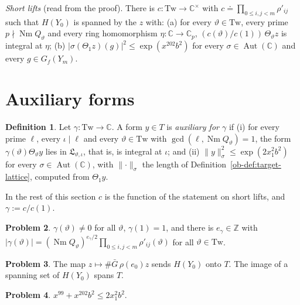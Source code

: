 \documentclass[reqno]{amsart}
\theoremstyle{definition}
\newtheorem{problem}{Problem}[section]
\newtheorem{definition}[problem]{Definition}
\theoremstyle{plain}
\newcommand{\Z}{\mathbb Z}
\newcommand{\C}{\mathbb C}
\newcommand{\Nm}{\operatorname{Nm}}
\newcommand{\Tw}{\mathrm{Tw}}
\newcommand{\Gb}{\bar G}
\begin{document}
\emph{Short lifts} (read from the proof).  There is \(c\colon\Tw\to\C^\times\) with \(c \doteq \prod_{0 \le i, j < m}\rho'_{ij}\) such that \(H(Y_0)\) is spanned by the \(z\) with: (a) for every \(\vartheta \in \Tw\), every prime \(p \nmid \Nm Q_\vartheta\) and every ring homomorphism \(\eta\colon\C\to\C_p\), \((c(\vartheta)/c(1))\,\Theta_\vartheta z\) is integral at \(\eta\); (b) \(\lvert\sigma(\Theta_1z)(g)\rvert^2 \le \exp(x^{202}b^2)\) for every \(\sigma \in \operatorname{Aut}(\C)\) and every \(g \in G_f(Y_m)\).

\section{Auxiliary forms}\label{sec:aux}

\begin{definition}\label{def:aux}
Let \(\gamma\colon\Tw\to\C\).  A form \(y \in T\) is \emph{auxiliary for \(\gamma\)} if
(i) for every prime \(\ell\), every \(\iota \mid \ell\) and every \(\vartheta \in \Tw\) with \(\gcd(\ell, \Nm Q_\vartheta) = 1\), the form \(\gamma(\vartheta)\Theta_\vartheta y\) lies in \(\mathfrak L_{\vartheta,\iota}\), that is, is integral at \(\iota\); and
(ii) \(\lVert y\rVert_\sigma^2 \le \exp(2x_1^2b^2)\) for every \(\sigma \in \operatorname{Aut}(\C)\), with \(\lVert\cdot\rVert_\sigma\) the length of Definition~\ref{ob-def:target-lattice}, computed from \(\Theta_1 y\).
\end{definition}

In the rest of this section \(c\) is the function of the statement on short lifts, and \(\gamma := c/c(1)\).

\begin{problem}\label{pr:gamma}
\(\gamma(\vartheta) \ne 0\) for all \(\vartheta\), \(\gamma(1) = 1\), and there is \(e_\gamma \in \Z\) with \(\lvert\gamma(\vartheta)\rvert = (\Nm Q_\vartheta)^{e_\gamma/2}\prod_{0 \le i, j < m}\rho'_{ij}(\vartheta)\) for all \(\vartheta \in \Tw\).
\end{problem}

\begin{problem}\label{pr:onto}
The map \(z \mapsto \#\Gb\,\rho(e_0)z\) sends \(H(Y_0)\) onto \(T\).  The image of a spanning set of \(H(Y_0)\) spans \(T\).
\end{problem}

\begin{problem}\label{pr:exponent}
\(x^{99} + x^{202}b^2 \le 2x_1^2b^2\).
\end{problem}
\end{document}
